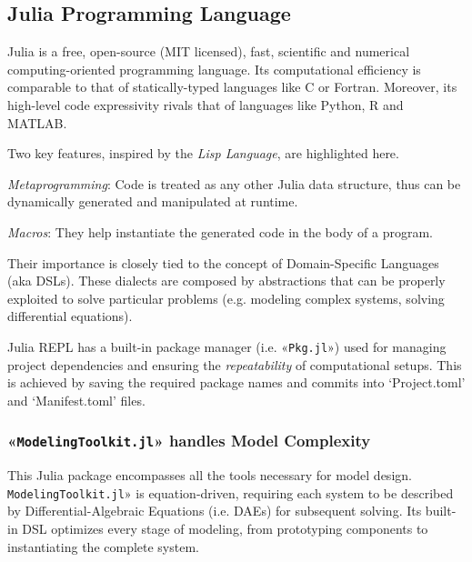 \subsection{Julia Programming Language}
\label{subsec:julia}

Julia is a free, open-source (MIT licensed), fast, scientific and
numerical computing-oriented programming language.  Its computational
efficiency is comparable to that of statically-typed languages like C
or Fortran.  Moreover, its high-level code expressivity rivals that of
languages like Python, R and MATLAB\cite{juliadocs2024}.

Two key features, inspired by the \emph{Lisp Language}, are
highlighted here.

\begin{description}
\item \emph{Metaprogramming}: Code is treated as any other Julia data
  structure, thus can be dynamically generated and manipulated at
  runtime.
\item \emph{Macros}: They help instantiate the generated code in the
  body of a program.
\end{description}

Their importance is closely tied to the concept of Domain-Specific
Languages (aka DSLs).  These dialects are composed by abstractions
that can be properly exploited to solve particular problems
(e.g. modeling complex systems, solving differential equations).

Julia REPL has a built-in package manager (i.e. «\texttt{Pkg.jl}»)
used for managing project dependencies and ensuring the
\emph{repeatability} of computational setups.  This is achieved by
saving the required package names and commits into `Project.toml' and
`Manifest.toml' files.

\subsubsection{«\texttt{ModelingToolkit.jl}» handles
  Model Complexity}
\label{subsubsec:modelingtoolkit}

This Julia package encompasses all the tools necessary for model
design.  \texttt{ModelingToolkit.jl}» is equation-driven, requiring
each system to be described by Differential-Algebraic Equations
(i.e. DAEs) for subsequent solving\cite{ma2021}. Its built-in DSL
optimizes every stage of modeling, from prototyping components to
instantiating the complete system.

